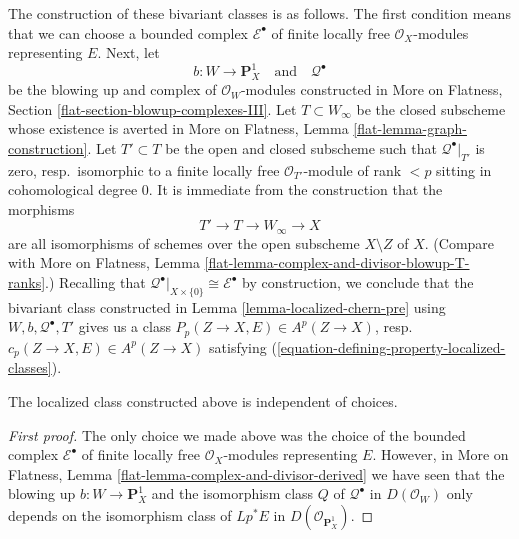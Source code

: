 \medskip\noindent
The construction of these bivariant classes is as follows. The first condition
means that we can choose a bounded complex $\mathcal{E}^\bullet$ of
finite locally free $\mathcal{O}_X$-modules representing $E$. Next, let
$$
b : W \longrightarrow \mathbf{P}^1_X
\quad\text{and}\quad
\mathcal{Q}^\bullet
$$
be the blowing up and complex of $\mathcal{O}_W$-modules constructed in
More on Flatness, Section \ref{flat-section-blowup-complexes-III}.
Let $T \subset W_\infty$ be the closed subscheme whose existence is
averted in More on Flatness, Lemma \ref{flat-lemma-graph-construction}.
Let $T' \subset T$ be the open and closed subscheme such that
$\mathcal{Q}^\bullet|_{T'}$ is zero, resp.\ isomorphic to a
finite locally free $\mathcal{O}_{T'}$-module of rank $< p$
sitting in cohomological degree $0$. It is immediate from the construction
that the morphisms
$$
T' \to T \to W_\infty \to X
$$
are all isomorphisms of schemes over the open subscheme $X \setminus Z$ of $X$.
(Compare with More on Flatness, Lemma
\ref{flat-lemma-complex-and-divisor-blowup-T-ranks}.)
Recalling that
$\mathcal{Q}^\bullet|_{X \times \{0\}} \cong \mathcal{E}^\bullet$
by construction, we conclude that the bivariant class constructed in
Lemma \ref{lemma-localized-chern-pre}
using $W, b, \mathcal{Q}^\bullet, T'$ gives us a class
$P_p(Z \to X, E) \in A^p(Z \to X)$, resp.\ $c_p(Z \to X, E) \in A^p(Z \to X)$
satisfying (\ref{equation-defining-property-localized-classes}).

\begin{lemma}
\label{lemma-independent-loc-chern}
The localized class constructed above is independent of choices.
\end{lemma}

\begin{proof}[First proof]
The only choice we made above was the choice of the bounded complex
$\mathcal{E}^\bullet$ of finite locally free $\mathcal{O}_X$-modules
representing $E$. However, in
More on Flatness, Lemma \ref{flat-lemma-complex-and-divisor-derived}
we have seen that the blowing up $b : W \to \mathbf{P}^1_X$
and the isomorphism class $Q$ of $\mathcal{Q}^\bullet$ in $D(\mathcal{O}_W)$
only depends on the isomorphism class of $Lp^*E$ in
$D(\mathcal{O}_{\mathbf{P}^1_X})$.
\end{proof}

